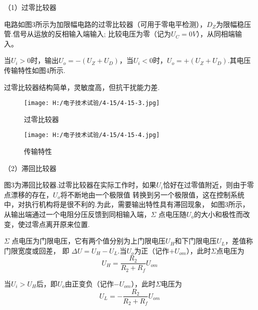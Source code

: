 \documentclass{article}
\begin{document}
              \par
               （1）过零比较器\par
               电路如图3所示为加限幅电路的过零比较器（可用于零电平检测），$D_Z$为限幅稳压管.信号从运放的反相输入端输入;
               比较电压为零（记为$U_C=0V$），从同相端输入。\par
               当$U_i>$0时，输出$U_o=-(U_Z+U_D)$，当$U_i<0$时，$U_o=+(U_Z+U_D)$.其电压传输特性如图4所示.\par
               过零比较器结构简单，灵敏度高，但抗干扰能力差.\par
               \begin{figure}[h]
                \begin{minipage}[t]{0.5\linewidth} %
                  \centering   
                  \texttt{[image: H:/电子技术试验/4-15/4-15-3.jpg]}   
                  \caption{过零比较器}   
                  \label{fig:side:a}   
                \end{minipage}%
                \begin{minipage}[t]{0.5\linewidth}   
                  \centering   
                  \texttt{[image: H:/电子技术试验/4-15/4-15-4.jpg]}   
                  \caption{传输特性}   
                  \label{fig:side:b}   
                \end{minipage}   
              \end{figure}
              \par
              （2）滞回比较器\par
               图3为滞回比较器.过零比较器在实际工作时，如果$U_i$恰好在过零值附近，则由于零点漂移的存在，$U_o$将不断地由一个极限值
               转换到另一个极限值，这在控制系统中，对执行机构将是很不利的.为此，需要输出特性具有滞回现象，
               如图3所示，从输出端通过一个电阻分压反馈到同相输入端，$\Sigma$ 点电压随$U_o$的大小和极性而改变，使过零点离开原来位置.\par
               $\Sigma$ 点电压为门限电压，它有两个值分别为上门限电压$U_H$和下门限电压$U_L$，差值称门限宽度或回差，
               即 $\Delta U=U_H-U_L$.当$U_o$为正（记作$+U_{om}$），此时$\Sigma$点电压为\[U_H=\frac{R_2}{R_2+R_f}U_{om}\]  \par
               当$U_i>U_H$后，即$U_o$由正变负（记作$-U_{om}$），此时$\Sigma$电压为\[U_L=-\frac{R_2}{R_2+R_f}U_{om}\]  \par
\end{document}
